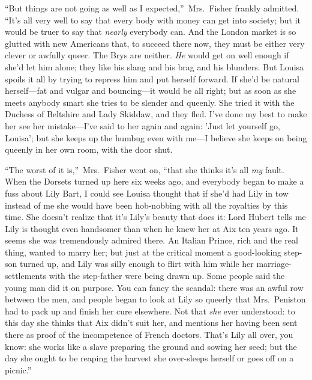 \documentclass[12pt,a4paper]{book}
\begin{document}
``But things are not going as well as I expected,''\ Mrs.\ Fisher
frankly admitted. ``It's all very well to say that every body with
money can get into society; but it would be truer to say that
\textit{nearly} everybody can. And the London market is so glutted with
new Americans that, to succeed there now, they must be either
very clever or awfully queer. The Brys are neither. \textit{He} would get
on well enough if she'd let him alone; they like his slang and
his brag and his blunders. But Louisa spoils it all by trying to
repress him and put herself forward. If she'd be natural
herself---fat and vulgar and bouncing---it would be all right; but
as soon as she meets anybody smart she tries to be slender and
queenly. She tried it with the Duchess of Beltshire and Lady
Skiddaw, and they fled. I've done my best to make her see her
mistake---I've said to her again and again: 'Just let yourself go,
Louisa'; but she keeps up the humbug even with me---I believe she
keeps on being queenly in her own room, with the door shut.





``The worst of it is,''\ Mrs.\ Fisher went on, ``that she thinks it's
all \textit{my} fault. When the Dorsets turned up here six weeks ago, and
everybody began to make a fuss about Lily Bart, I could
see Louisa thought that if she'd had Lily in tow instead of me
she would have been hob-nobbing with all the royalties by this
time. She doesn't realize that it's Lily's beauty that does it: 
Lord Hubert tells me Lily is thought even handsomer than when he
knew her at Aix ten years ago. It seems she was tremendously
admired there. An Italian Prince, rich and the real thing, wanted
to marry her; but just at the critical moment a good-looking
step-son turned up, and Lily was silly enough to flirt with him
while her marriage-settlements with the step-father were being
drawn up. Some people said the young man did it on purpose. You
can fancy the scandal: there was an awful row between the men,
and people began to look at Lily so queerly that Mrs.\ Peniston
had to pack up and finish her cure elsewhere. Not that \textit{she} ever
understood: to this day she thinks that Aix didn't suit her, and
mentions her having been sent there as proof of the incompetence
of French doctors. That's Lily all over, you know: she works like
a slave preparing the ground and sowing her seed; but the day she
ought to be reaping the harvest she over-sleeps herself or goes
off on a picnic.''
\end{document}
